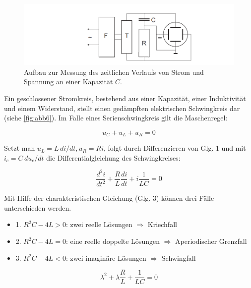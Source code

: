 \documentclass[11pt,ngerman]{scrartcl}
\begin{document}
\begin{figure}[H]
	\begin{center}
		\includegraphics[width=\textwidth]{abb5}
	\end{center}
	\caption{Aufbau zur Messung des zeitlichen Verlaufs von Strom und Spannung an einer Kapazität $C$.}
	\label{fig:abb5}
\end{figure}

Ein geschlossener Stromkreis, bestehend aus einer Kapazität, einer Induktivität und einem Widerstand,
stellt einen gedämpften elektrischen Schwingkreis dar (siehe \autoref{fig:abb6}). Im Falle eines
Serienschwingkreis gilt die Maschenregel:

\begin{equation}
	u_C + u_L + u_R = 0
\end{equation}

Setzt man $u_L = L\, di/dt, u_R = Ri$, folgt durch Differenzieren von Glg. 1 und mit $i_c = C \,du_c/dt$
die Differentialgleichung des Schwingkreises:

\begin{equation}
	\frac{d^2i}{dt^2} + \frac{R}{L} \frac{di}{dt} + i\frac{1}{LC} = 0
\end{equation}

Mit Hilfe der charakteristischen Gleichung (Glg. 3) können drei Fälle unterschieden werden.

\begin{itemize}

	\item 1. $R^2C - 4L > 0$: zwei reelle Lösungen $\Rightarrow$ Kriechfall

	\item 2. $R^2C - 4L = 0$: eine reelle doppelte Lösungen $\Rightarrow$ Aperiodischer Grenzfall

	\item 3. $R^2C - 4L < 0$: zwei imaginäre Lösungen $\Rightarrow$ Schwingfall

\end{itemize}

\begin{equation}
	\lambda^2 + \lambda \frac{R}{L} + \frac{1}{LC} = 0
\end{equation}
\end{document}
